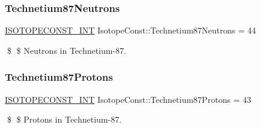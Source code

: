 \subsubsection{\texorpdfstring{Technetium87\+Neutrons}{Technetium87Neutrons}}
{\footnotesize\ttfamily \mbox{\hyperlink{group___isotope_const-_macros_ga5f18360b3e99483a35c32d789e62621c}{I\+S\+O\+T\+O\+P\+E\+C\+O\+N\+S\+T\+\_\+\+I\+NT}} Isotope\+Const\+::\+Technetium87\+Neutrons = 44}

\$ \$ Neutrons in Technetium-\/87. \mbox{\label{group___isotope_const-_technetium-_tc87_gab8885551d13b9a6c1e7a3de678c1c2ec}} 
\subsubsection{\texorpdfstring{Technetium87\+Protons}{Technetium87Protons}}
{\footnotesize\ttfamily \mbox{\hyperlink{group___isotope_const-_macros_ga5f18360b3e99483a35c32d789e62621c}{I\+S\+O\+T\+O\+P\+E\+C\+O\+N\+S\+T\+\_\+\+I\+NT}} Isotope\+Const\+::\+Technetium87\+Protons = 43}

\$ \$ Protons in Technetium-\/87. 